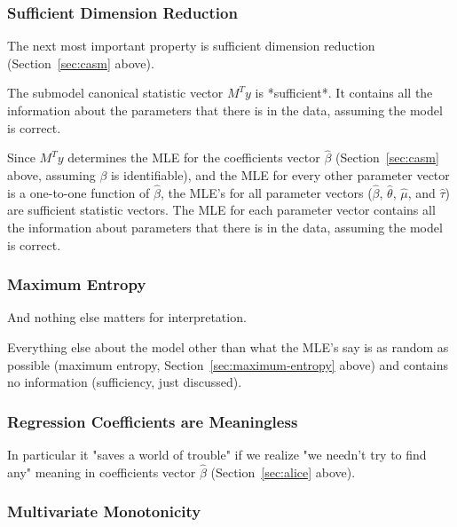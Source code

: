 \documentclass[11pt]{article}
\begin{document}
\subsubsection{Sufficient Dimension Reduction}
\label{sec:sufficient-dimension-reduction-in-review}

The next most important property is sufficient dimension reduction
(Section~\ref{sec:casm} above).

The submodel canonical statistic vector $M^T y$ is *sufficient*.
It contains all the information about the parameters that there is in the
data, assuming the model is correct.

Since $M^T y$ determines
the MLE for the coefficients vector $\hat{\beta}$ (Section~\ref{sec:casm} above,
assuming $\beta$ is identifiable),
and the MLE for every other parameter vector is a one-to-one function
of $\hat{\beta}$,
the MLE's for all parameter vectors
($\hat{\beta}$, $\hat{\theta}$, $\hat{\mu}$, and $\hat{\tau}$)
are sufficient statistic vectors.
The MLE for each parameter vector contains all the information about
parameters that there is in the data, assuming the model is correct.

\subsubsection{Maximum Entropy} \label{sec:maximum-entropy-in-review}

And nothing else matters for interpretation.

Everything else about the model other than what the MLE's say is as random
as possible (maximum entropy, Section~\ref{sec:maximum-entropy} above) and
contains no information (sufficiency, just discussed).

\subsubsection{Regression Coefficients are Meaningless}
\label{sec:regression-coefficients-are-meaningless-in-review}

In particular it "saves a world of trouble" if we realize
"we needn't try to find any" meaning in coefficients vector $\hat{\beta}$
(Section~\ref{sec:alice} above).

\subsubsection{Multivariate Monotonicity}
\label{sec:multivariate-monotonicity-in-review}
\end{document}
